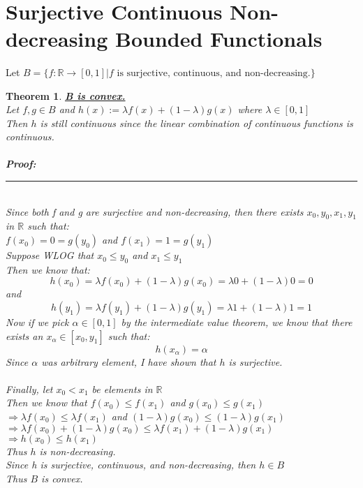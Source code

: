 \documentclass[12pt]{extarticle}
\theoremstyle{plain}
\newtheorem{thm}{Theorem}[section]
\theoremstyle{plain}
\theoremstyle{plain}
\theoremstyle{Definition}
\theoremstyle{Definition}
\theoremstyle{plain}
\theoremstyle{plain}
\newcommand{\cut}[0]{\noindent\framebox[\linewidth]{\rule{\linewidth}{2pt}}\\}
\newcommand{\prof}[0]{	\noindent \textbf{Proof:} \rule{500pt}{2pt} \\ }
\begin{document}
\cut
\section{Surjective Continuous Non-decreasing Bounded Functionals}
	Let $B = \{f : \mathbb{R} \to [0,1] | f \text{ is surjective, continuous, and non-decreasing.}\}$ \\ 
	\begin{thm} \underline{\textbf{B is convex.}} \\
			Let $f,g \in B$ and $h(x) := \lambda f(x) + (1-\lambda)g(x)$ where $\lambda \in [0,1]$ \\ 
			Then $h$ is still continuous since the linear combination of continuous functions is continuous.  \\ \\
			\prof
			Since both f and g are surjective and non-decreasing, then there exists $x_0,y_0,x_1,y_1$ in $\mathbb{R}$ such that: \\ 
			$f(x_0) = 0 = g(y_0)$ and $f(x_1) = 1 = g(y_1)$ \\ 
			Suppose WLOG that $x_0 \leq y_0$ and $x_1 \leq y_1$ \\
			Then we know that: 
			$$h(x_0) = \lambda f(x_0) + (1-\lambda)g(x_0) = \lambda 0 + (1-\lambda)0 = 0$$
			and 
			$$h(y_1) = \lambda f(y_1) + (1-\lambda)g(y_1) = \lambda 1 + (1-\lambda)1 = 1$$
			Now if we pick $\alpha \in [0,1]$ by the intermediate value theorem, we know that there exists an $x_\alpha \in [x_0,y_1]$ such that: 
			$$h(x_\alpha) = \alpha$$
			Since $\alpha$ was arbitrary element, I have shown that $h$ is surjective. \\ \\
			Finally, let $x_0 < x_1$ be elements in $\mathbb{R}$ \\ 
			Then we know that $f(x_0) \leq f(x_1)$ and $g(x_0) \leq g(x_1)$ \\ 
			$\Rightarrow \lambda f(x_0) \leq \lambda f(x_1)$ and $(1-\lambda)g(x_0) \leq (1-\lambda)g(x_1)$ \\ 
			$\Rightarrow \lambda f(x_0) + (1-\lambda)g(x_0) \leq \lambda f(x_1) + (1-\lambda)g(x_1)$ \\ 
			$\Rightarrow h(x_0) \leq h(x_1)$ \\ 
			Thus $h$ is non-decreasing. \\ 
			Since h is surjective, continuous, and non-decreasing, then $h \in B$ \\ 
			Thus $B$ is convex. 
	\end{thm}
	\cut
\end{document}
